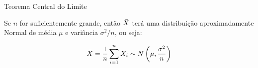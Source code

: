 





\begin{frame}{Teorema Central do Limite}

    Se $n$  for suficientemente grande, então $\Bar{X}$ terá uma distribuição aproximadamente Normal de média $\mu$ e variância $\sigma^2/n$, ou seja:

    $$\Bar{X} = \dfrac{1}{n}\sum_{i=1}^n X_i \sim N\left( \mu, \dfrac{\sigma^2}{n}\right)$$
\end{frame}

